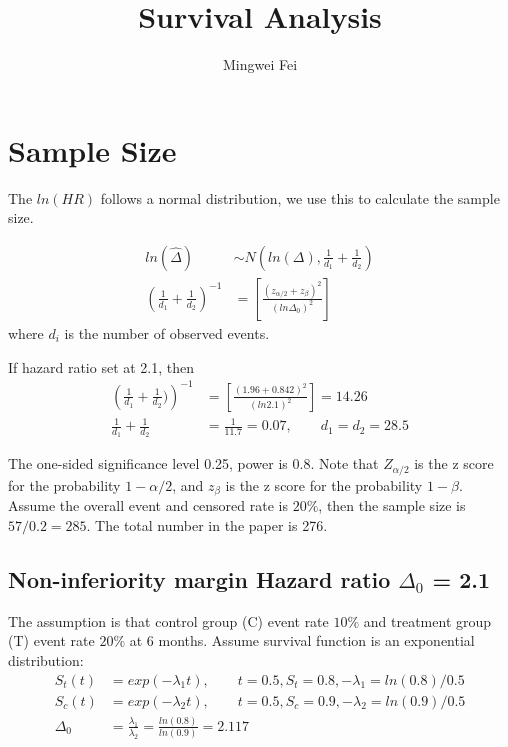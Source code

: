 \documentclass[11pt]{article} %
\title{Survival Analysis}
\author{Mingwei Fei}
\begin{document}
	
	\maketitle
	
	\section{Sample Size}
	The $ln(HR)$ follows a normal distribution, we use this to calculate the sample size.
	
	\begin{align*}
	ln (\hat{\Delta}) & \sim N\left(ln(\Delta),  \frac{1}{d_1} + \frac{1}{d_2} \right) \\
	\left( \frac{1}{d_1} + \frac{1}{d_2} \right)^{-1} &= \left[ \frac{(z_{\alpha/2} + z_{\beta})^2}{(ln \Delta_0)^2} \right] 
	\end{align*}
	where $d_i$ is the number of observed events. 
	
	If hazard ratio set at 2.1, then 
	\begin{align*}
	\left( \frac{1}{d_1} + \frac{1}{d_2} )\right)^{-1} &= \left[ \frac{(1.96 + 0.842)^2}{(ln 2.1)^2} \right] = 14.26\\
	\frac{1}{d_1} + \frac{1}{d_2} &= \frac{1}{11.7} = 0.07, \qquad	d_1 = d_2 = 28.5
	\end{align*}
	
	The one-sided significance level 0.25, power is 0.8. Note that $Z_{\alpha/2}$ is the z score for the probability $1-\alpha/2$, and $z_{\beta}$ is the z score for the probability $1-\beta$. Assume the overall event and censored rate is $20\%$, then the sample size is $57/0.2 = 285$. The total number in the paper is 276.
	
	
	\subsection{Non-inferiority margin Hazard ratio $\Delta_0$ = 2.1}
	The assumption is that control group (C) event rate $10\%$ and treatment group (T) event rate $20\%$ at 6 months. Assume survival function is an exponential distribution:
	\begin{align*}
	S_t(t) &= exp(-\lambda_1 t), \qquad t= 0.5, S_t = 0.8 , -\lambda_1 = ln(0.8)/0.5\\
	S_c(t) &=  exp(-\lambda_2 t), \qquad t= 0.5, S_c = 0.9, -\lambda_2 = ln(0.9)/0.5  \\
	\Delta_0 &= \frac{\lambda_1}{\lambda_2}= \frac{ln(0.8)}{ln(0.9)} = 2.117
	\end{align*}	
\end{document}
